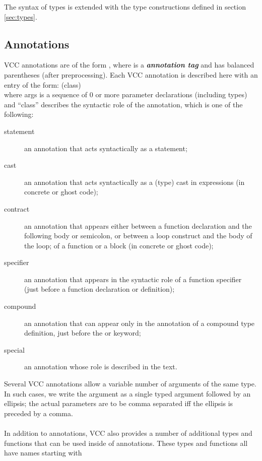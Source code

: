 \documentclass[preprint,nocopyrightspace]{sigplanconf}
\newcommand{\Def}[1]{\textit{\textbf{#1}}}
\begin{document}
{The syntax of types is extended with the type constructions defined in
section \ref{sec:types}.

\subsection{Annotations}

VCC annotations are of the form , where  is
a \Def{annotation tag} and  has balanced parentheses (after
preprocessing). Each VCC annotation is described here with an entry of the form:
\noindent{} (class)\\
where args is a sequence of 0 or more parameter declarations
(including types) and ``class'' describes the syntactic role of the
annotation, which is one of the following:
\begin{description}
\item[statement] an annotation that acts syntactically as a statement;
\item[cast] an annotation that acts syntactically as a (type) cast in
expressions (in concrete or ghost code);
\item[contract] an annotation that appears either between a function
declaration and the following body or semicolon, or between a loop
construct and the body of the loop;
of a function or a block (in concrete or ghost code);
\item[specifier] an annotation that appears in the syntactic role of a
function specifier (just before a function declaration or definition);
\item[compound] an annotation that can appear only in the annotation
of a compound type definition, just before the  or 
keyword;
\item[special] an annotation whose role is described in the text.
\end{description}
Several VCC annotations allow a variable number of arguments of the
same type. In such cases, we write the argument as a single typed
argument followed by an ellipsis; the actual parameters are to be 
comma separated iff the ellipsis is preceded by a comma.
\\\\
In addition to annotations, VCC also provides a number of additional
types and functions that can be used inside of annotations. These
types and functions all have names starting with }
\end{document}
